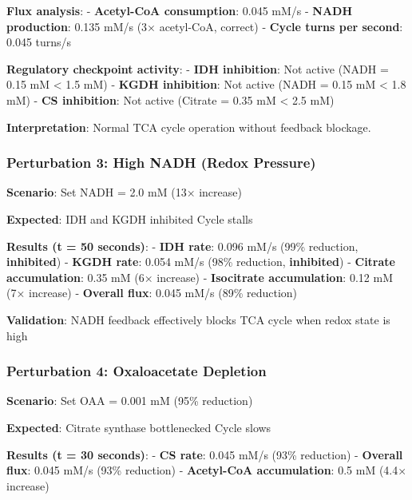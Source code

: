 \textbf{Flux analysis}: - \textbf{Acetyl-CoA consumption}: 0.045 mM/s -
\textbf{NADH production}: 0.135 mM/s (3× acetyl-CoA, correct) -
\textbf{Cycle turns per second}: 0.045 turns/s

\textbf{Regulatory checkpoint activity}: - \textbf{IDH inhibition}: Not
active (NADH = 0.15 mM \textless{} 1.5 mM) - \textbf{KGDH inhibition}:
Not active (NADH = 0.15 mM \textless{} 1.8 mM) - \textbf{CS inhibition}:
Not active (Citrate = 0.35 mM \textless{} 2.5 mM)

\textbf{Interpretation}: Normal TCA cycle operation without feedback
blockage.

\hypertarget{perturbation-3-high-nadh-redox-pressure}{%
\subsubsection{Perturbation 3: High NADH (Redox
Pressure)}\label{perturbation-3-high-nadh-redox-pressure}}

\textbf{Scenario}: Set NADH = 2.0 mM (13× increase)

\textbf{Expected}: IDH and KGDH inhibited \textrightarrow Cycle stalls

\textbf{Results (t = 50 seconds)}: - \textbf{IDH rate}: 0.096 
mM/s (99\% reduction, \textbf{inhibited}) - \textbf{KGDH rate}: 0.054  mM/s (98\% reduction, \textbf{inhibited}) - \textbf{Citrate
accumulation}: 0.35  mM (6× increase) - \textbf{Isocitrate
accumulation}: 0.12  mM (7× increase) - \textbf{Overall flux}:
0.045  mM/s (89\% reduction)

\textbf{Validation}: NADH feedback effectively blocks TCA cycle when
redox state is high \checkmark

\hypertarget{perturbation-4-oxaloacetate-depletion}{%
\subsubsection{Perturbation 4: Oxaloacetate
Depletion}\label{perturbation-4-oxaloacetate-depletion}}

\textbf{Scenario}: Set OAA = 0.001 mM (95\% reduction)

\textbf{Expected}: Citrate synthase bottlenecked \textrightarrow Cycle slows

\textbf{Results (t = 30 seconds)}: - \textbf{CS rate}: 0.045 
mM/s (93\% reduction) - \textbf{Overall flux}: 0.045  mM/s (93\%
reduction) - \textbf{Acetyl-CoA accumulation}: 0.5  mM (4.4×
increase)


